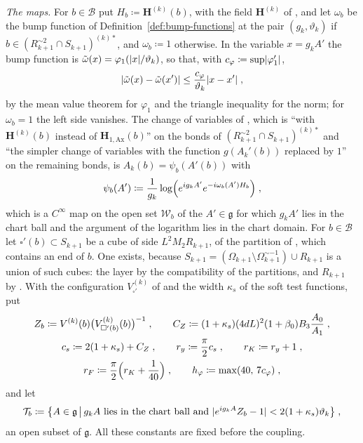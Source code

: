 \documentclass[11pt]{preprint}
\DeclarePairedDelimiter{\abs}{\lvert}{\rvert}
\numberwithin{equation}{section}
\theoremstyle{definition}
\theoremstyle{remark}
\theoremstyle{plain}
\begin{document}
\emph{The maps.} For $b \in \mathcal B$ put $H_b \coloneqq \mathbf H^{(k)}(b)$, with the field $\mathbf H^{(k)}$ of \cite[(3.22), p.~269]{BalabanCRE}, and let $\omega_b$ be the bump function of Definition~\ref{def:bump-functions} at the pair $(g_k, \vartheta_k)$ if $b \in (R_{k+1}^{\sim2} \cap S_{k+1})^{(k)*}$, and $\omega_b \coloneqq 1$ otherwise. In the variable $x = g_kA'$ the bump function is $\tilde\omega(x) = \varphi_1(\abs x/\vartheta_k)$, so that, with $c_\varphi \coloneqq \sup\abs{\varphi_1'}$,
\begin{equation}\label{eq:bump-lipschitz}
    \abs{\tilde\omega(x) - \tilde\omega(x')} \leq \frac{c_\varphi}{\vartheta_k}\abs{x - x'}\;,
\end{equation}
by the mean value theorem for $\varphi_1$ and the triangle inequality for the norm; for $\omega_b = 1$ the left side vanishes. The change of variables of \cite[p.~269]{BalabanCRE}, which is \cite[(1.22), p.~251]{BalabanCRE} ``with $\mathbf H^{(k)}(b)$ instead of $\mathbf H_{1,\mathrm{Ax}}(b)$'' on the bonds of $(R_{k+1}^{\sim2} \cap S_{k+1})^{(k)*}$ and ``the simpler change of variables with the function $g(A_k'(b))$ replaced by $1$'' on the remaining bonds, is $A_k(b) = \psi_b(A'(b))$ with
\begin{equation}\label{eq:boundary-change-map}
    \psi_b(A') \coloneqq \frac{1}{g_k}\log\Bigl(e^{ig_kA'}e^{-i\omega_b(A')H_b}\Bigr)\;,
\end{equation}
which is a $C^\infty$ map on the open set $\mathcal W_b$ of the $A' \in \mathfrak g$ for which $g_kA'$ lies in the chart ball and the argument of the logarithm lies in the chart domain. For $b \in \mathcal B$ let $\square'(b) \subset S_{k+1}$ be a cube of side $L^2M_2R_{k+1}$, of the partition of \cite[p.~265]{BalabanCRE}, which contains an end of $b$. One exists, because $S_{k+1} = (\Omega_{k+1} \setminus \Omega_{k+1}^{\sim-1}) \cup R_{k+1}$ is a union of such cubes: the layer by the compatibility of the partitions, and $R_{k+1}$ by \cite[(3.16), p.~268]{BalabanCRE}. With the configuration $V^{(k)}_{\square'}$ of \cite[(3.4), p.~265]{BalabanCRE} and the width $\kappa_s$ of the soft test functions, put
\begin{equation}\label{eq:boundary-change-constants}
\begin{gathered}
    Z_b \coloneqq V^{(k)}(b)\bigl(V^{(k)}_{\square'(b)}(b)\bigr)^{-1}\;,
    \qquad
    C_Z \coloneqq (1 + \kappa_s)(4dL)^2(1 + \beta_0)B_3\frac{A_0}{A_1}\;,\\
    c_s \coloneqq 2(1 + \kappa_s) + C_Z\;,
    \qquad
    r_y \coloneqq \frac{\pi}{2}c_s\;,
    \qquad
    r_K \coloneqq r_y + 1\;,\\
    r_F \coloneqq \frac{\pi}{2}\Bigl(r_K + \frac{1}{40}\Bigr)\;,
    \qquad
    h_\varphi \coloneqq \max(40,\, 7c_\varphi)\;,
\end{gathered}
\end{equation}
and let
\begin{equation}\label{eq:boundary-change-test-set}
    \mathcal T_b \coloneqq \bigl\{ A \in \mathfrak g \,\big|\, g_kA \text{ lies in the chart ball and } \abs{e^{ig_kA}Z_b - 1} < 2(1 + \kappa_s)\vartheta_k \bigr\}\;,
\end{equation}
an open subset of $\mathfrak g$. All these constants are fixed before the coupling.
\end{document}
